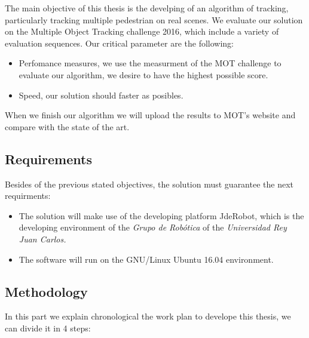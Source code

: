 \documentclass[12pt, a4paper, titlepage,twoside,openright]{article}
\begin{document}
The main objective of this thesis is the develping of an algorithm of tracking, particularly tracking multiple pedestrian on real scenes. We evaluate our solution on the Multiple Object Tracking challenge 2016, which include a variety of evaluation sequences. Our critical parameter are the following:

\begin{itemize}

\item Perfomance measures, we use the measurment of the MOT \cite{mot} challenge to evaluate our algorithm, we desire to have the highest possible score. 

\item Speed, our solution should faster as posibles.

\end{itemize}

When we finish our algorithm we will upload the results to MOT's website and compare with the state of the art.

\subsection{Requirements}

Besides of the previous stated objectives, the solution must guarantee the next requirments: 

\begin{itemize}

\item The solution will make use of the developing platform JdeRobot, which is the developing environment of the \textit{Grupo de Robótica} of the \textit{Universidad  Rey Juan Carlos.} 

\item The software will run on the GNU/Linux Ubuntu 16.04 environment.


\end{itemize}


\subsection{Methodology}

In this part we explain chronological the work plan to develope this thesis, we can divide it in 4 steps: 
\end{document}
